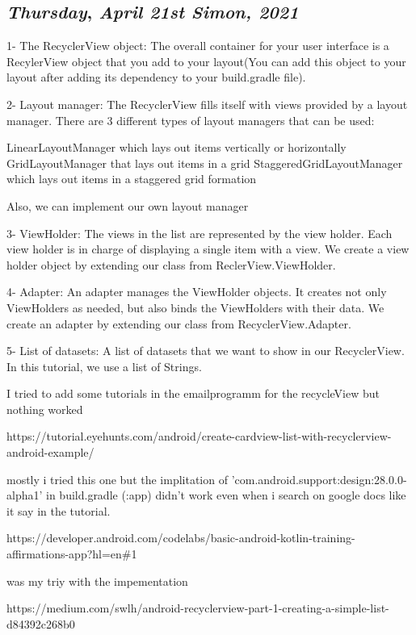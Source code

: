 \def\day{\textit{April 21st Simon, 2021}}
\def\weekday{\textit{Thursday}}
\subsection*{\weekday, \day}


1- The RecyclerView object: The overall container for your user interface is a RecylerView object that you add to your layout(You can add this object to your layout after adding its dependency to your build.gradle file).

2- Layout manager: The RecyclerView fills itself with views provided by a layout manager. There are 3 different types of layout managers that can be used:

    LinearLayoutManager which lays out items vertically or horizontally
    GridLayoutManager that lays out items in a grid
    StaggeredGridLayoutManager which lays out items in a staggered grid formation

Also, we can implement our own layout manager

3- ViewHolder: The views in the list are represented by the view holder. Each view holder is in charge of displaying a single item with a view. We create a view holder object by extending our class from ReclerView.ViewHolder.

4- Adapter: An adapter manages the ViewHolder objects. It creates not only ViewHolders as needed, but also binds the ViewHolders with their data. We create an adapter by extending our class from RecyclerView.Adapter.

5- List of datasets: A list of datasets that we want to show in our RecyclerView. In this tutorial, we use a list of Strings.

I tried to add some tutorials in the emailprogramm for the recycleView but nothing worked

https://tutorial.eyehunts.com/android/create-cardview-list-with-recyclerview-android-example/

mostly i tried this one but the implitation of 'com.android.support:design:28.0.0-alpha1' in build.gradle (:app) didn't work even when i search on google docs like it say in the tutorial.

https://developer.android.com/codelabs/basic-android-kotlin-training-affirmations-app?hl=en\#1

was my triy with the impementation

https://medium.com/swlh/android-recyclerview-part-1-creating-a-simple-list-d84392c268b0

